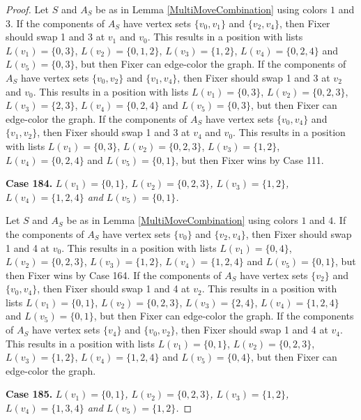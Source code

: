 \documentclass[12pt]{amsart}
\theoremstyle{plain}
\theoremstyle{definition}
\theoremstyle{remark}
\begin{document}
\begin{proof}
Let $S$ and $A_S$ be as in Lemma \ref{MultiMoveCombination} using colors $1$ and $3$. If the components of $A_S$ have vertex sets $\{v_0, v_1\}$ and $\{v_2, v_4\}$, then Fixer should swap 1 and 3 at $v_1$ and $v_0$. This results in a position with lists $L(v_1) = \{0, 3\}$, $L(v_2) = \{0, 1, 2\}$, $L(v_3) = \{1, 2\}$, $L(v_4) = \{0, 2, 4\}$ and $L(v_5) = \{0, 3\}$, but then Fixer can edge-color the graph.
If the components of $A_S$ have vertex sets $\{v_0, v_2\}$ and $\{v_1, v_4\}$, then Fixer should swap 1 and 3 at $v_2$ and $v_0$. This results in a position with lists $L(v_1) = \{0, 3\}$, $L(v_2) = \{0, 2, 3\}$, $L(v_3) = \{2, 3\}$, $L(v_4) = \{0, 2, 4\}$ and $L(v_5) = \{0, 3\}$, but then Fixer can edge-color the graph.
If the components of $A_S$ have vertex sets $\{v_0, v_4\}$ and $\{v_1, v_2\}$, then Fixer should swap 1 and 3 at $v_4$ and $v_0$. This results in a position with lists $L(v_1) = \{0, 3\}$, $L(v_2) = \{0, 2, 3\}$, $L(v_3) = \{1, 2\}$, $L(v_4) = \{0, 2, 4\}$ and $L(v_5) = \{0, 1\}$, but then Fixer wins by Case 111.

\noindent\textbf{Case 184.  }\textit{$L(v_1) = \{0, 1\}$, $L(v_2) = \{0, 2, 3\}$, $L(v_3) = \{1, 2\}$, $L(v_4) = \{1, 2, 4\}$ and $L(v_5) = \{0, 1\}$.}

Let $S$ and $A_S$ be as in Lemma \ref{MultiMoveCombination} using colors $1$ and $4$. If the components of $A_S$ have vertex sets $\{v_0\}$ and $\{v_2, v_4\}$, then Fixer should swap 1 and 4 at $v_0$. This results in a position with lists $L(v_1) = \{0, 4\}$, $L(v_2) = \{0, 2, 3\}$, $L(v_3) = \{1, 2\}$, $L(v_4) = \{1, 2, 4\}$ and $L(v_5) = \{0, 1\}$, but then Fixer wins by Case 164.
If the components of $A_S$ have vertex sets $\{v_2\}$ and $\{v_0, v_4\}$, then Fixer should swap 1 and 4 at $v_2$. This results in a position with lists $L(v_1) = \{0, 1\}$, $L(v_2) = \{0, 2, 3\}$, $L(v_3) = \{2, 4\}$, $L(v_4) = \{1, 2, 4\}$ and $L(v_5) = \{0, 1\}$, but then Fixer can edge-color the graph.
If the components of $A_S$ have vertex sets $\{v_4\}$ and $\{v_0, v_2\}$, then Fixer should swap 1 and 4 at $v_4$. This results in a position with lists $L(v_1) = \{0, 1\}$, $L(v_2) = \{0, 2, 3\}$, $L(v_3) = \{1, 2\}$, $L(v_4) = \{1, 2, 4\}$ and $L(v_5) = \{0, 4\}$, but then Fixer can edge-color the graph.

\noindent\textbf{Case 185.  }\textit{$L(v_1) = \{0, 1\}$, $L(v_2) = \{0, 2, 3\}$, $L(v_3) = \{1, 2\}$, $L(v_4) = \{1, 3, 4\}$ and $L(v_5) = \{1, 2\}$.}


\end{proof}
\end{document}
